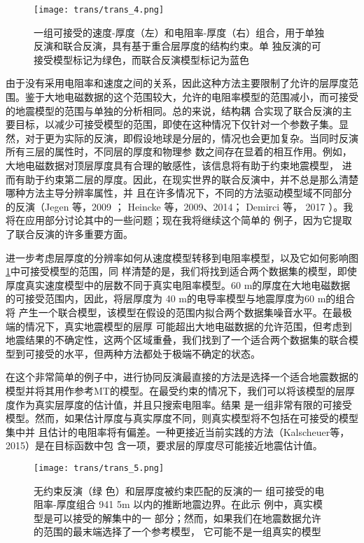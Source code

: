 \begin{figure}
    \centering
    \texttt{[image: trans/trans\_4.png]}
    \setcounter{figure}{3}
    \caption{一组可接受的速度-厚度（左）和电阻率-厚度（右）组合，用于单独反演和联合反演，具有基于重合层厚度的结构约束。单 独反演的可接受模型标记为绿色，而联合反演模型标记为蓝色}\label{trans4}

\end{figure}

由于没有采用电阻率和速度之间的关系，因此这种方法主要限制了允许的层厚度范围。鉴于大地电磁数据的这个范围较大，允许的电阻率模型的范围减小，而可接受的地震模型的范围与单独的分析相同。总的来说，结构耦 合实现了联合反演的主要目标，以减少可接受模型的范围，即使在这种情况下仅针对一个参数子集。显然，对于更为实际的反演，即假设地球是分层的，情况也会更加复杂。当同时反演所有三层的属性时，不同层的厚度和物理参 数之间存在显着的相互作用。例如，大地电磁数据对顶层厚度具有合理的敏感性，该信息将有助于约束地震模型， 进而有助于约束第二层的厚度。因此，在现实世界的联合反演中，并不总是那么清楚哪种方法主导分辨率属性，并 且在许多情况下，不同的方法驱动模型域不同部分的反演（Jegen 等，2009 ； Heincke 等，2009、2014； Demirci 等， 2017 ）。我将在应用部分讨论其中的一些问题；现在我将继续这个简单的 例子，因为它提取了联合反演的许多重要方面。

进一步考虑层厚度的分辨率如何从速度模型转移到电阻率模型，以及它如何影响图\ref{trans4}中可接受模型的范围，同 样清楚的是，我们将找到适合两个数据集的模型，即使厚度真实速度模型中的层数不同于真实电阻率模型。60 m的厚度在大地电磁数据的可接受范围内，因此，将层厚度为 40 m的电导率模型与地震厚度为60 m的组合将 产生一个联合模型，该模型在假设的范围内拟合两个数据集噪音水平。在最极端的情况下，真实地震模型的层厚 可能超出大地电磁数据的允许范围，但考虑到地震结果的不确定性，这两个区域重叠，我们找到了一个适合两个数据集的联合模型到可接受的水平，但两种方法都处于极端不确定的状态。

在这个非常简单的例子中，进行协同反演最直接的方法是选择一个适合地震数据的模型并将其用作参考MT的模型。在最受约束的情况下，我们可以将该模型的层厚度作为真实层厚度的估计值，并且只搜索电阻率。结果 是一组非常有限的可接受模型。然而，如果估计厚度与真实厚度不同，则真实模型将不包括在可接受的模型集中并 且估计的电阻率将有偏差。一种更接近当前实践的方法（Kalscheuer等， 2015）是在目标函数中包 含一项，要求层的厚度尽可能接近地震估计值。

\begin{figure}[H]
    \centering
    \texttt{[image: trans/trans\_5.png]}
    \caption{无约束反演（绿 色）和层厚度被约束匹配的反演的一 组可接受的电阻率-厚度组合 941 5m 以内的推断地震边界。在此示 例中，真实模型是可以接受的解集中的一 部分；然而，如果我们在地震数据允许的范围的最末端选择了一个参考模型， 它可能不是一组真实的模型}\label{trans5}

\end{figure}

